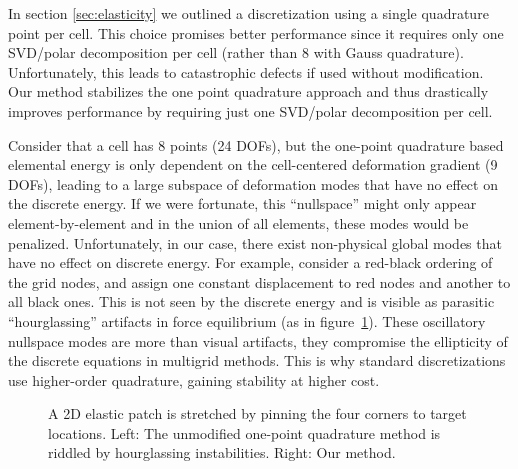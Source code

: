 In section \ref{sec:elasticity} we outlined a discretization using a single quadrature point per cell. This choice promises better performance since it requires only one SVD/polar decomposition per cell (rather than 8 with Gauss quadrature). Unfortunately, this leads to catastrophic defects if used without modification. Our method stabilizes the one point quadrature approach and thus drastically improves performance by requiring just one SVD/polar decomposition per cell.

Consider that a cell has 8 points (24 DOFs), but the one-point quadrature based elemental energy is only dependent on the cell-centered deformation gradient (9 DOFs), leading to a large subspace of deformation modes that have no effect on the discrete energy. If we were
fortunate, this ``nullspace'' might only appear element-by-element and in the
union of all elements, these modes would be penalized. Unfortunately, in our
case, there exist non-physical global modes that have no effect on discrete
energy. For example, consider a red-black ordering of the grid nodes, and assign one
constant displacement to red nodes and another to all black ones. This is not
seen by the discrete energy and is visible as parasitic ``hourglassing''
artifacts in force equilibrium (as in figure~\ref{fig_instability}).  These
oscillatory nullspace modes are more than visual artifacts, they compromise the
ellipticity of the discrete equations in multigrid methods. This is why standard
discretizations use higher-order quadrature, gaining stability at higher cost.

\begin{figure}[b!]
\caption{A 2D elastic patch is stretched by pinning the four corners to target locations. Left: The unmodified one-point quadrature method is riddled by hourglassing
  instabilities. Right: Our method.}
\vspace{-10pt}
\label{fig_instability}
\end{figure}


